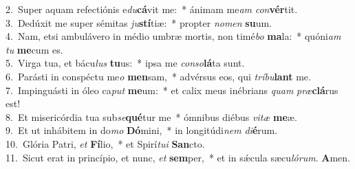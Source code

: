 {2.~}Super aquam refectiónis e\textit{du}\textbf{cá}vit me:~* ánimam me\textit{am} \textit{con}\textbf{vér}tit.\\
{3.~}Dedúxit me super sémitas \textit{ju}\textbf{stí}tiæ:~* propter \textit{no}\textit{men} \textbf{su}um.\\
{4.~}Nam, etsi ambulávero in médio umbræ mortis, non timé\textit{bo} \textbf{ma}la:~* quóni\textit{am} \textit{tu} \textbf{me}cum es.\\
{5.~}Virga tua, et bácu\textit{lus} \textbf{tu}us:~* ipsa me \textit{con}\textit{so}\textbf{lá}ta sunt.\\
{6.~}Parásti in conspéctu me\textit{o} \textbf{men}sam,~* advérsus eos, qui \textit{trí}\textit{bu}\textbf{lant} me.\\
{7.~}Impinguásti in óleo ca\textit{put} \textbf{me}um:~* et calix meus inébrians \textit{quam} \textit{præ}\textbf{clá}rus est!\\
{8.~}Et misericórdia tua sub\textit{se}\textbf{qué}tur me~* ómnibus diébus \textit{vi}\textit{tæ} \textbf{me}æ.\\
{9.~}Et ut inhábitem in do\textit{mo} \textbf{Dó}mini,~* in longitúdi\textit{nem} \textit{di}\textbf{é}rum.\\
{10.~}Glória Patri, \textit{et} \textbf{Fí}lio,~* et Spirí\textit{tu}\textit{i} \textbf{San}cto.\\
{11.~}Sicut erat in princípio, et nunc, \textit{et} \textbf{sem}per,~* et in sǽcula sæcu\textit{ló}\textit{rum}. \textbf{A}men.\\
